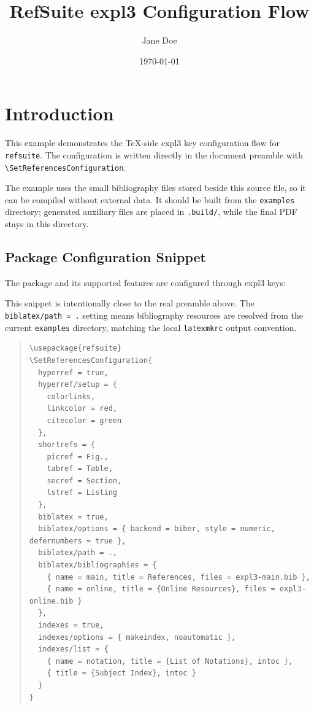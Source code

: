 \documentclass{article}
\newcounter{listing}
\begin{document}
\title{RefSuite expl3 Configuration Flow}
\author{Jane Doe}
\date{\today}
\maketitle

\tableofcontents

\section{Introduction}
\label{sec:introduction}

This example demonstrates the TeX-side expl3 key configuration flow for
\texttt{refsuite}. The configuration is written directly in the document preamble
with \verb|\SetReferencesConfiguration|.

The example uses the small bibliography files stored beside this source file, so
it can be compiled without external data.  It should be built from the
\texttt{examples} directory; generated auxiliary files are placed in
\texttt{.build/}, while the final PDF stays in this directory.

\subsection{Package Configuration Snippet}

The package and its supported features are configured through expl3 keys:

This snippet is intentionally close to the real preamble above.  The
\verb|biblatex/path = .| setting means bibliography resources are resolved from
the current \texttt{examples} directory, matching the local \texttt{latexmkrc}
output convention.

\begin{quote}
\begin{verbatim}
\usepackage{refsuite}
\SetReferencesConfiguration{
  hyperref = true,
  hyperref/setup = {
    colorlinks,
    linkcolor = red,
    citecolor = green
  },
  shortrefs = {
    picref = Fig.,
    tabref = Table,
    secref = Section,
    lstref = Listing
  },
  biblatex = true,
  biblatex/options = { backend = biber, style = numeric, defernumbers = true },
  biblatex/path = .,
  biblatex/bibliographies = {
    { name = main, title = References, files = expl3-main.bib },
    { name = online, title = {Online Resources}, files = expl3-online.bib }
  },
  indexes = true,
  indexes/options = { makeindex, noautomatic },
  indexes/list = {
    { name = notation, title = {List of Notations}, intoc },
    { title = {Subject Index}, intoc }
  }
}
\end{verbatim}
\end{quote}
\label{lst:configuration}
\end{document}
